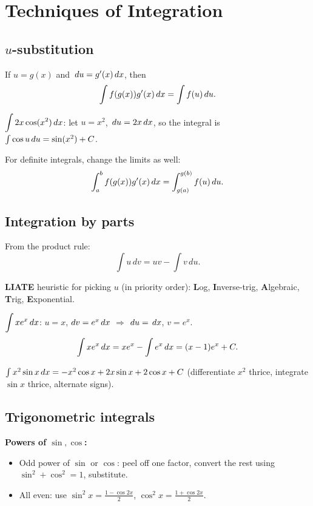 \section{Techniques of Integration}

\subsection{$u$-substitution}
If $u = g(x)$ and $\,du = g'(x) \,dx$, then
\[ \int f(g(x)) g'(x) \,dx = \int f(u) \,du. \]

\begin{example}
$\displaystyle \int 2x \cos(x^2) \,dx$: let $u = x^2$, $\,du = 2x \,dx$, so the integral is
$\int \cos u \,du = \sin(x^2) + C$.
\end{example}

For definite integrals, change the limits as well:
\[ \int_a^b f(g(x)) g'(x) \,dx = \int_{g(a)}^{g(b)} f(u) \,du. \]

\subsection{Integration by parts}
From the product rule:
\[ \int u \, dv = u v - \int v \, du. \]

\textbf{LIATE} heuristic for picking $u$ (in priority order):
\textbf{L}og, \textbf{I}nverse-trig, \textbf{A}lgebraic, \textbf{T}rig, \textbf{E}xponential.

\begin{example}
$\displaystyle \int x e^x \,dx$: $u = x$, $dv = e^x \,dx$ $\Rightarrow$ $du = \,dx$, $v = e^x$.
\[ \int x e^x \,dx = x e^x - \int e^x \,dx = (x - 1) e^x + C. \]
\end{example}

\begin{example}
$\int x^2 \sin x \,dx = -x^2 \cos x + 2x \sin x + 2\cos x + C$
(differentiate $x^2$ thrice, integrate $\sin x$ thrice, alternate signs).
\end{example}

\subsection{Trigonometric integrals}
\textbf{Powers of $\sin, \cos$:}
\begin{itemize}[leftmargin=*,nosep]
  \item Odd power of $\sin$ or $\cos$: peel off one factor, convert the rest using $\sin^2 + \cos^2 = 1$, substitute.
  \item All even: use $\sin^2 x = \tfrac{1 - \cos 2x}{2}$, $\cos^2 x = \tfrac{1 + \cos 2x}{2}$.
\end{itemize}

